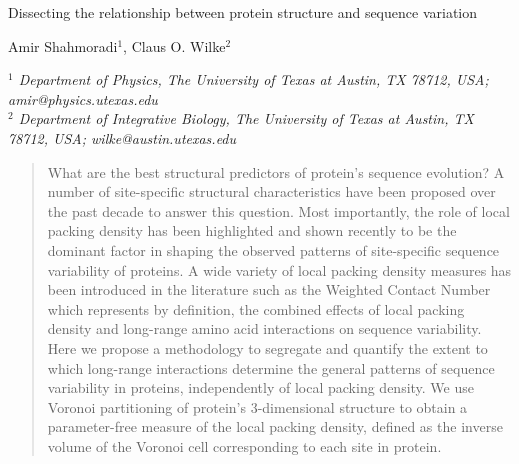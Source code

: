 \documentclass[11pt]{article}
\makeatletter
\newcommand\pubnumber{}
\newcommand\pubdate{\today}
\def\affiliation{$^1$ Department of Physics, The University of Texas at Austin, TX 78712, USA; amir@physics.utexas.edu \\
                 $^2$ Department of Integrative Biology, The University of Texas at Austin, TX 78712, USA; wilke@austin.utexas.edu
                 }
\def\Title#1{\begin{center} {\Large #1 } \end{center}}
\def\Author#1{\begin{center}{ \sc #1} \end{center}}
\def\Address#1{\begin{center}{ \it #1} \end{center}}
\newcommand\pubblock{\rightline{\begin{tabular}{l} \pubnumber\\
         \pubdate  \end{tabular}}}
\newenvironment{Abstract}{\begin{quotation}  }{\end{quotation}}
\makeatother
\begin{document}
\begin{titlepage}
\pubblock

\vfill
\Title{Dissecting the relationship between protein structure and sequence variation}
\vfill
\Author{Amir Shahmoradi$^{1}$, Claus O. Wilke$^2$}
\Address{\affiliation}
\vfill
\begin{Abstract}

    What are the best structural predictors of protein's sequence evolution? A number of site-specific structural characteristics have been proposed over the past decade to answer this question. Most importantly, the role of local packing density has been highlighted and shown recently to be the dominant factor in shaping the observed patterns of site-specific sequence variability of proteins. A wide variety of local packing density measures has been introduced in the literature such as the Weighted Contact Number which represents by definition, the combined effects of local packing density and long-range amino acid interactions on sequence variability. Here we propose a methodology to segregate and quantify the extent to which long-range interactions determine the general patterns of sequence variability in proteins, independently of local packing density. We use Voronoi partitioning of protein's 3-dimensional structure to obtain a parameter-free measure of the local packing density, defined as the inverse volume of the Voronoi cell corresponding to each site in protein.


\end{Abstract}
\end{titlepage}
\end{document}
